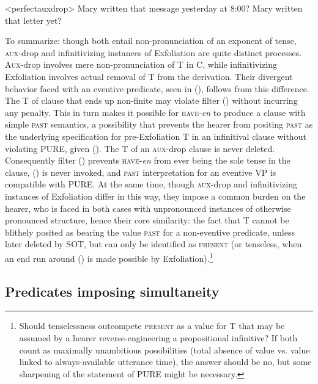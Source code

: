 \documentclass[output=paper]{langscibook}
\begin{document}
\pex<perfectauxdrop>
\a \ljudge*Mary written that message yesterday at 8:00?
\a Mary written that letter yet?
\xe

To summarize: though both entail non-pronunciation of an exponent of tense, \textsc{aux-}drop and infinitivizing instances of Exfoliation are quite distinct processes. \textsc{Aux-}drop involves mere non-pronunciation of T in C, while infinitivizing Exfoliation involves actual removal of T from the derivation. Their divergent behavior faced with an eventive predicate, seen in (), follows from this difference. The T of clause that ends up non-finite may violate filter () without incurring any penalty. This in turn makes it possible for \textsc{have-}\textit{en }to produce a clause with simple \textsc{past }semantics, a possibility that prevents the hearer from positing \textsc{past }as the underlying specification for pre-Exfoliation T in an infinitival clause without violating PURE, given (). The T of an \textsc{aux-}drop clause is never deleted. Consequently filter () prevents \textsc{have-}\textit{en} from ever being the sole tense in the clause, () is never invoked, and \textsc{past }interpretation for an eventive VP is compatible with PURE. At the same time, though \textsc{aux-}drop and\textsc{ }infinitivizing instances of Exfoliation differ in this way, they impose a common burden on the hearer, who is faced in both cases with unpronounced instances of otherwise pronounced structure, hence their core similarity: the fact that \textsc{T }cannot be blithely posited as bearing the value \textsc{past }for a non-eventive predicate, unless later deleted by SOT, but can only be identified as \textsc{present} (or tenseless, when an end run around\textsc{ }() is made possible by Exfoliation).\footnote{Should tenselessness outcompete \textsc{present }as a value for T that may be assumed by a hearer\textsc{ }reverse-engineering a propositional infinitive? If both count as maximally unambitious possibilities (total absence of value vs. value linked to always-available utterance time), the answer should be no, but some sharpening of the statement of PURE might be necessary.}

\subsection{Predicates imposing simultaneity}
\end{document}
